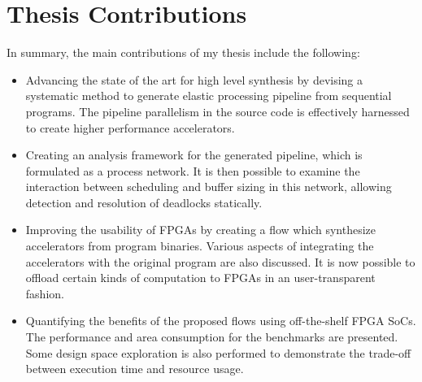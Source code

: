 


\section{Thesis Contributions}

In summary, the main contributions of my thesis include the following:
\begin{itemize}
    \item Advancing the state of the art for high level synthesis by devising a systematic
    method to generate elastic processing pipeline from sequential programs. The pipeline
    parallelism in the source code is effectively harnessed to create higher performance
    accelerators.
    \item Creating an analysis framework for the generated pipeline, which is formulated as a process network. It is then possible to examine the interaction between scheduling and buffer sizing in this network, allowing detection and resolution of deadlocks statically.
    \item Improving the usability of FPGAs by creating a flow which synthesize
    accelerators from program binaries. Various aspects of integrating the accelerators with the original program are also discussed. It is now possible to offload certain kinds of computation to FPGAs in an user-transparent fashion.
    \item Quantifying the benefits of the proposed flows using off-the-shelf FPGA SoCs. The
    performance and area consumption for the benchmarks are presented. Some design space exploration is also performed to demonstrate the trade-off between execution time and resource usage.
    
    
\end{itemize}


